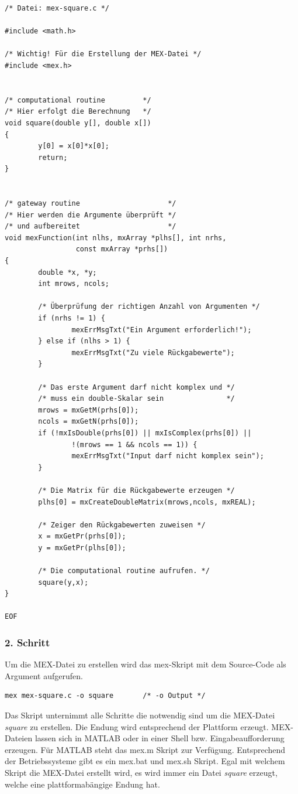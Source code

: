 \documentclass[a4paper,11pt]{article}
\begin{document}
\begin{verbatim}
/* Datei: mex-square.c */

#include <math.h>

/* Wichtig! Für die Erstellung der MEX-Datei */
#include <mex.h>


/* computational routine         */
/* Hier erfolgt die Berechnung   */
void square(double y[], double x[])
{
        y[0] = x[0]*x[0];
        return;
}


/* gateway routine                     */
/* Hier werden die Argumente überprüft */
/* und aufbereitet                     */ 
void mexFunction(int nlhs, mxArray *plhs[], int nrhs,
                 const mxArray *prhs[])
{
        double *x, *y;
        int mrows, ncols;

        /* Überprüfung der richtigen Anzahl von Argumenten */
        if (nrhs != 1) {
                mexErrMsgTxt("Ein Argument erforderlich!");
        } else if (nlhs > 1) {
                mexErrMsgTxt("Zu viele Rückgabewerte");
        }

        /* Das erste Argument darf nicht komplex und */
        /* muss ein double-Skalar sein               */
        mrows = mxGetM(prhs[0]);
        ncols = mxGetN(prhs[0]);
        if (!mxIsDouble(prhs[0]) || mxIsComplex(prhs[0]) ||
                !(mrows == 1 && ncols == 1)) {
                mexErrMsgTxt("Input darf nicht komplex sein");
        }

        /* Die Matrix für die Rückgabewerte erzeugen */
        plhs[0] = mxCreateDoubleMatrix(mrows,ncols, mxREAL);

        /* Zeiger den Rückgabewerten zuweisen */
        x = mxGetPr(prhs[0]);
        y = mxGetPr(plhs[0]);

        /* Die computational routine aufrufen. */
        square(y,x);
}

EOF
\end{verbatim}
\subsubsection*{2. Schritt}
Um die MEX-Datei zu erstellen wird das mex-Skript mit dem Source-Code
als Argument aufgerufen.
\begin{verbatim}
mex mex-square.c -o square       /* -o Output */
\end{verbatim}
Das Skript unternimmt alle Schritte die notwendig sind um die MEX-Datei
\textit{square} zu erstellen. Die Endung wird entsprechend der Plattform
erzeugt. MEX-Dateien lassen sich in MATLAB oder in einer Shell bzw.
Eingabeaufforderung erzeugen. Für MATLAB steht das mex.m Skript zur
Verfügung. Entsprechend der Betriebssysteme gibt es ein mex.bat und mex.sh
Skript. Egal mit welchem Skript die MEX-Datei erstellt wird, es
wird immer ein Datei \textit{square} erzeugt, welche eine plattformabängige 
Endung hat.
\end{document}
